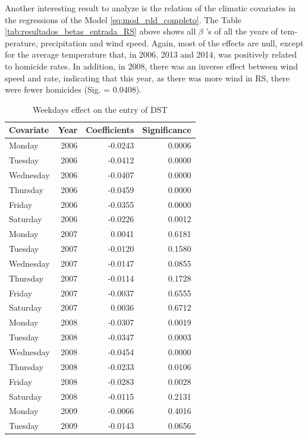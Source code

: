 \documentclass[12pt,openright,oneside,a4paper,english,french,spanish]{abntex2}
\numberwithin{table}{section} %
\numberwithin{figure}{section} %
\begin{document}
\begin{otherlanguage}{english}
Another interesting result to analyze is the relation of the climatic covariates in the regressions of the Model \ref{eq:mod_rdd_completo}. The Table \ref{tab:resultados_betas_entrada_RS} above shows all $\beta $ 's of all the years of temperature, precipitation and wind speed. Again, most of the effects are null, except for the average temperature that, in 2006, 2013 and 2014, was positively related to homicide rates. In addition, in 2008, there was an inverse effect between wind speed and rate, indicating that this year, as there was more wind in RS, there were fewer homicides (Sig. = 0.0408).

\begin{table}[H]
\caption{Weekdays effect on the entry of DST}
\begin{center}
\begin{tiny}
\begin{tabular}{lrrr}
  \hline
Covariate & Year & Coefficients & Significance \\ 
  \hline
  Monday &  2006 & -0.0243 & 0.0006 \\ 
  Tuesday &  2006 & -0.0412 & 0.0000 \\ 
  Wednesday &  2006 & -0.0407 & 0.0000 \\ 
  Thursday &  2006 & -0.0459 & 0.0000 \\ 
  Friday &  2006 & -0.0355 & 0.0000 \\ 
  Saturday &  2006 & -0.0226 & 0.0012 \\ 
  Monday &  2007 & 0.0041 & 0.6181 \\ 
  Tuesday &  2007 & -0.0120 & 0.1580 \\ 
  Wednesday &  2007 & -0.0147 & 0.0855 \\ 
  Thursday &  2007 & -0.0114 & 0.1728 \\ 
  Friday &  2007 & -0.0037 & 0.6555 \\ 
  Saturday &  2007 & 0.0036 & 0.6712 \\ 
  Monday &  2008 & -0.0307 & 0.0019 \\ 
  Tuesday &  2008 & -0.0347 & 0.0003 \\ 
  Wednesday &  2008 & -0.0454 & 0.0000 \\ 
  Thursday &  2008 & -0.0233 & 0.0106 \\ 
  Friday &  2008 & -0.0283 & 0.0028 \\ 
  Saturday &  2008 & -0.0115 & 0.2131 \\ 
  Monday &  2009 & -0.0066 & 0.4016 \\ 
  Tuesday &  2009 & -0.0143 & 0.0656 \\ 

\end{tabular}
\end{tiny}
\end{center}
\end{table}
\end{otherlanguage}
\end{document}
